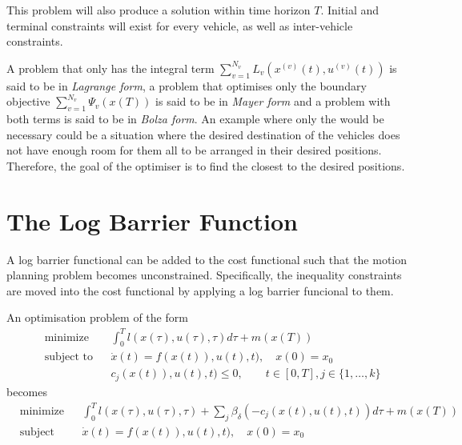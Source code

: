 \par This problem will also produce a solution within time horizon $T$. Initial and terminal constraints will exist for every vehicle, as well as inter-vehicle constraints.

\par A problem that only has the integral term $\sum_{v=1}^{N_v} L_v(x^{(v)}(t),u^{(v)}(t))$ is said to be in \textit{Lagrange form}, a problem that optimises only the boundary objective $\sum_{v=1}^{N_v} \Psi_v(x(T))$ is said to be in \textit{Mayer form} and a problem with both terms is said to be in \textit{Bolza form}. An example where only the  would be necessary could be a situation where the desired destination of the vehicles does not have enough room for them all to be arranged in their desired positions. Therefore, the goal of the optimiser is to find the closest to the desired positions.

\section{The Log Barrier Function}

\par A log barrier functional can be added to the cost functional such that the motion planning problem becomes unconstrained. Specifically, the inequality constraints are moved into the cost functional by applying a log barrier funcional to them.
\par An optimisation problem of the form 
\begin{equation}
    \label{eq:opt_prob_without_log_bar}
    \begin{aligned}
    & \text{minimize} && \int_0^T l(x(\tau),u(\tau),\tau)d\tau + m(x(T)) \\
    & \text{subject to}  && \dot{x}(t) = f(x(t)),u(t),t),\quad x(0)=x_0 \\
        & && c_j(x(t)),u(t),t)\leq 0, \qquad t\in [0,T],j\in \{1,\dots,k \}
    \end{aligned}
\end{equation}
becomes
\begin{equation}
    \label{eq:opt_prob_with_log_bar}
    \begin{aligned}
    & \text{minimize} && \int_0^T l(x(\tau),u(\tau),\tau)+\sum_j \beta_\delta(-c_j(x(t),u(t),t))d\tau + m(x(T)) \\
    & \text{subject to}  && \dot{x}(t) = f(x(t)),u(t),t),\quad x(0)=x_0 \\
    \end{aligned}
\end{equation}

